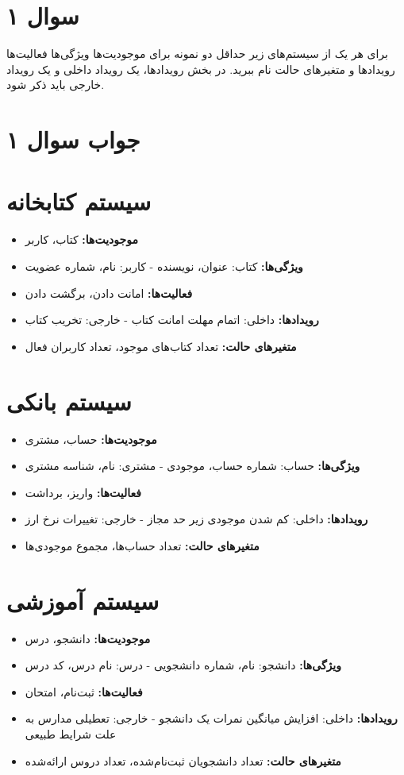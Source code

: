 \section*{سوال ۱}

برای هر یک از سیستم‌های زیر حداقل دو نمونه برای موجودیت‌ها 
ویژگی‌ها 
فعالیت‌ها 
رویدادها 
و متغیرهای حالت 
نام ببرید. در بخش رویدادها، یک رویداد داخلی 
و یک رویداد خارجی 
باید ذکر شود.

\section*{جواب سوال ۱}

\section*{سیستم کتابخانه}
\begin{itemize}
	\item \textbf{موجودیت‌ها:} کتاب، کاربر
	\item \textbf{ویژگی‌ها:} کتاب: عنوان، نویسنده - کاربر: نام، شماره عضویت
	\item \textbf{فعالیت‌ها:} امانت دادن، برگشت دادن
	\item \textbf{رویدادها:} داخلی: اتمام مهلت امانت کتاب - خارجی: تخریب کتاب
	\item \textbf{متغیرهای حالت:} تعداد کتاب‌های موجود، تعداد کاربران فعال
\end{itemize}

\section*{سیستم بانکی}
\begin{itemize}
	\item \textbf{موجودیت‌ها:} حساب، مشتری
	\item \textbf{ویژگی‌ها:} حساب: شماره حساب، موجودی - مشتری: نام، شناسه مشتری
	\item \textbf{فعالیت‌ها:} واریز، برداشت
	\item \textbf{رویدادها:} داخلی: کم شدن موجودی زیر حد مجاز - خارجی: تغییرات نرخ ارز
	\item \textbf{متغیرهای حالت:} تعداد حساب‌ها، مجموع موجودی‌ها
\end{itemize}

\section*{سیستم آموزشی}
\begin{itemize}
	\item \textbf{موجودیت‌ها:} دانشجو، درس
	\item \textbf{ویژگی‌ها:} دانشجو: نام، شماره دانشجویی - درس: نام درس، کد درس
	\item \textbf{فعالیت‌ها:} ثبت‌نام، امتحان
	\item \textbf{رویدادها:} داخلی: افزایش میانگین نمرات یک دانشجو - خارجی: تعطیلی مدارس به علت شرایط طبیعی
	\item \textbf{متغیرهای حالت:} تعداد دانشجویان ثبت‌نام‌شده، تعداد دروس ارائه‌شده
\end{itemize}

